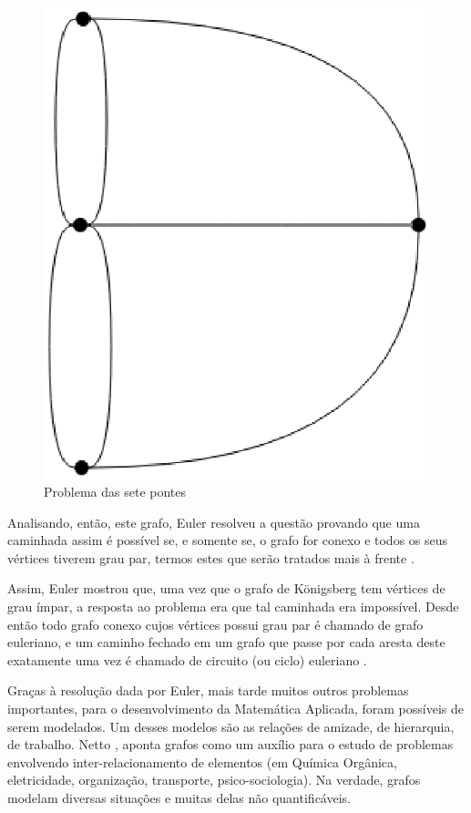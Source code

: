 \begin{figure}[!h]
	\centering
	\includegraphics[scale=0.25]{figuras/capitulo2/sete_pontes.eps}
	\caption{Problema das sete pontes}
	\label{sete_pontes}
\end{figure}

Analisando, então, este grafo, Euler resolveu a questão provando que uma caminhada assim é possível se, e somente se, o grafo for conexo e todos os seus vértices tiverem grau par, termos estes que serão tratados mais à frente \cite{Malta:2008}.

Assim, Euler mostrou que, uma vez que o grafo de Königsberg tem vértices de grau ímpar, a resposta ao problema era que tal caminhada era impossível. Desde então todo grafo conexo cujos vértices possui grau par é chamado de grafo euleriano, e um caminho fechado em um grafo que passe por cada aresta deste exatamente uma vez é chamado de circuito (ou ciclo) euleriano \cite{Malta:2008}.

Graças à resolução dada por Euler, mais tarde muitos outros problemas importantes, para o desenvolvimento da Matemática Aplicada, foram possíveis de serem modelados. Um desses modelos são as relações de amizade, de hierarquia, de trabalho. Netto \cite{Netto:2012}, aponta grafos como um auxílio para o estudo de problemas envolvendo inter-relacionamento de elementos (em Química Orgânica, eletricidade, organização, transporte, psico-sociologia). Na verdade, grafos modelam diversas situações e muitas delas não quantificáveis.

